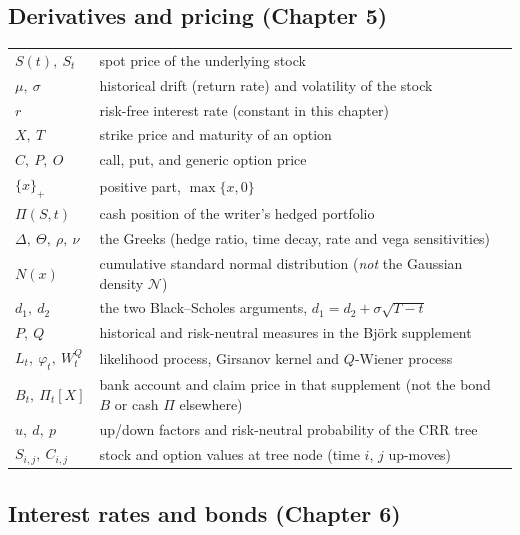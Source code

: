 \subsection*{Derivatives and pricing (Chapter 5)}

\begin{center}
\begin{tabular}{l p{10.2cm}}
\hline
$S(t),\ S_t$ & spot price of the underlying stock \\
$\mu,\ \sigma$ & historical drift (return rate) and volatility of the stock \\
$r$ & risk-free interest rate (constant in this chapter) \\
$X,\ T$ & strike price and maturity of an option \\
$C,\ P,\ O$ & call, put, and generic option price \\
$\{x\}_+$ & positive part, $\max\{x,0\}$ \\
$\Pi(S,t)$ & cash position of the writer's hedged portfolio \\
$\Delta,\ \Theta,\ \rho,\ \nu$ & the Greeks (hedge ratio, time decay, rate and vega sensitivities) \\
$N(x)$ & cumulative standard normal distribution (\emph{not} the Gaussian density $\mathcal{N}$) \\
$d_1,\ d_2$ & the two Black--Scholes arguments, $d_1 = d_2+\sigma\sqrt{T-t}$ \\
$P,\ Q$ & historical and risk-neutral measures in the Bj\"ork supplement \\
$L_t,\ \varphi_t,\ W_t^Q$ & likelihood process, Girsanov kernel and $Q$-Wiener process \\
$B_t,\ \Pi_t[X]$ & bank account and claim price in that supplement (not the bond $B$ or cash $\Pi$ elsewhere) \\
$u,\ d,\ p$ & up/down factors and risk-neutral probability of the CRR tree \\
$S_{i,j},\ C_{i,j}$ & stock and option values at tree node (time $i$, $j$ up-moves) \\
\hline
\end{tabular}
\end{center}

\subsection*{Interest rates and bonds (Chapter 6)}

